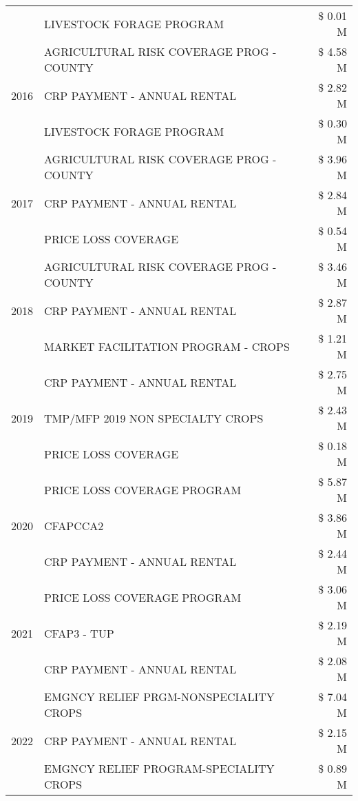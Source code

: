 \begin{tabular}{llr}
 & LIVESTOCK FORAGE PROGRAM & \$ 0.01 M \\
\cline{1-3}
\multirow[t]{3}{*}{2016} & AGRICULTURAL RISK COVERAGE PROG - COUNTY & \$ 4.58 M \\
 & CRP PAYMENT - ANNUAL RENTAL & \$ 2.82 M \\
 & LIVESTOCK FORAGE PROGRAM & \$ 0.30 M \\
\cline{1-3}
\multirow[t]{3}{*}{2017} & AGRICULTURAL RISK COVERAGE PROG - COUNTY & \$ 3.96 M \\
 & CRP PAYMENT - ANNUAL RENTAL & \$ 2.84 M \\
 & PRICE LOSS COVERAGE & \$ 0.54 M \\
\cline{1-3}
\multirow[t]{3}{*}{2018} & AGRICULTURAL RISK COVERAGE PROG - COUNTY & \$ 3.46 M \\
 & CRP PAYMENT - ANNUAL RENTAL & \$ 2.87 M \\
 & MARKET FACILITATION PROGRAM - CROPS & \$ 1.21 M \\
\cline{1-3}
\multirow[t]{3}{*}{2019} & CRP PAYMENT - ANNUAL RENTAL & \$ 2.75 M \\
 & TMP/MFP 2019 NON SPECIALTY CROPS & \$ 2.43 M \\
 & PRICE LOSS COVERAGE & \$ 0.18 M \\
\cline{1-3}
\multirow[t]{3}{*}{2020} & PRICE LOSS COVERAGE PROGRAM & \$ 5.87 M \\
 & CFAPCCA2 & \$ 3.86 M \\
 & CRP PAYMENT - ANNUAL RENTAL & \$ 2.44 M \\
\cline{1-3}
\multirow[t]{3}{*}{2021} & PRICE LOSS COVERAGE PROGRAM & \$ 3.06 M \\
 & CFAP3 - TUP & \$ 2.19 M \\
 & CRP PAYMENT - ANNUAL RENTAL & \$ 2.08 M \\
\cline{1-3}
\multirow[t]{3}{*}{2022} & EMGNCY RELIEF PRGM-NONSPECIALITY CROPS & \$ 7.04 M \\
 & CRP PAYMENT - ANNUAL RENTAL & \$ 2.15 M \\
 & EMGNCY RELIEF PROGRAM-SPECIALITY CROPS & \$ 0.89 M \\
\cline{1-3}
\bottomrule
\end{tabular}
